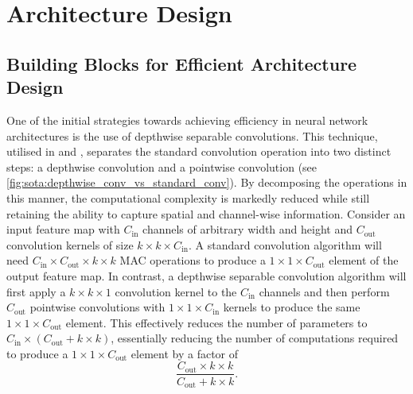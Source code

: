 \section{Architecture Design}\label{sec:sota:archi_design}

\subsection{Building Blocks for Efficient Architecture Design}\label{sec:sota:efficient_archi}

One of the initial strategies towards achieving efficiency in neural network
architectures is the use of depthwise separable convolutions. This technique,
utilised in \cite{howard2017mobilenets} and \cite{DBLP:conf/icml/TanL19},
separates the standard convolution operation into two distinct steps: a
depthwise convolution and a pointwise convolution (see
\cref{fig:sota:depthwise_conv_vs_standard_conv}). By decomposing the operations
in this manner, the computational complexity is markedly reduced while still
retaining the ability to capture spatial and channel-wise information. Consider
an input feature map with $C_\text{in}$ channels of arbitrary width and height
and $C_\text{out}$ convolution kernels of size $k\times k \times C_\text{in}$. A
standard convolution algorithm will need $C_\text{in} \times C_\text{out} \times
k \times k$ \ac{MAC} operations to produce a $1 \times 1 \times C_\text{out}$
element of the output feature map. In contrast, a depthwise separable
convolution algorithm will first apply a $k\times k \times 1$ convolution kernel
to the $C_\text{in}$ channels and then perform $C_\text{out}$ pointwise
convolutions with $1\times 1 \times C_\text{in}$ kernels to produce the same
$1\times 1 \times C_\text{out}$ element. This effectively reduces the number of
parameters to $C_\text{in} \times (C_\text{out} + k \times k)$, essentially
reducing the number of computations required to produce a $1 \times 1 \times
C_\text{out}$ element by a factor of\\

$$\displaystyle\frac{C_\text{out}\times k \times k}{C_\text{out} + k \times k}.$$\\

